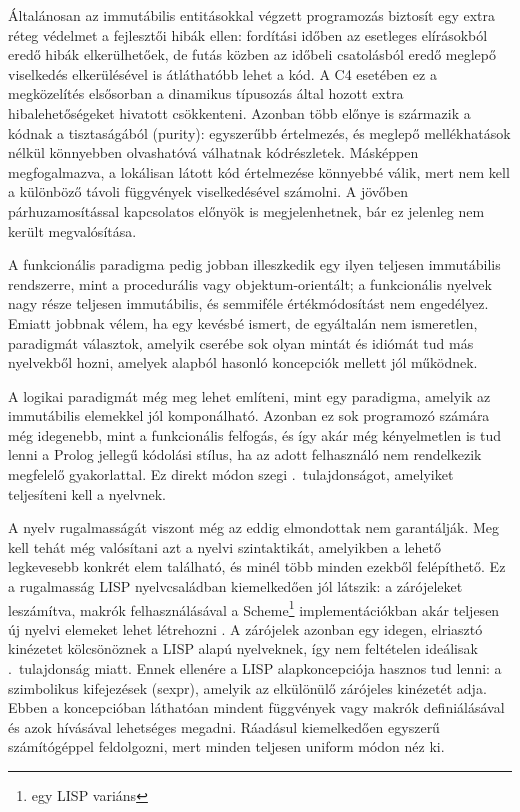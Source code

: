 Általánosan az immutábilis entitásokkal végzett programozás biztosít egy extra réteg védelmet a fejlesztői hibák ellen: fordítási időben az esetleges elírásokból eredő hibák elkerülhetőek, de futás közben az időbeli csatolásból eredő meglepő viselkedés elkerülésével is átláthatóbb lehet a kód.
A C4 esetében ez a megközelítés elsősorban a dinamikus típusozás által hozott extra hibalehetőségeket hivatott csökkenteni. 
Azonban több előnye is származik a kódnak a tisztaságából (purity): egyszerűbb értelmezés, és meglepő mellékhatások nélkül könnyebben olvashatóvá válhatnak kódrészletek.
Másképpen megfogalmazva, a lokálisan látott kód értelmezése könnyebbé válik, mert nem kell a különböző távoli függvények viselkedésével számolni.
A jövőben párhuzamosítással kapcsolatos előnyök is megjelenhetnek, bár ez jelenleg nem került megvalósítása.

A funkcionális paradigma pedig jobban illeszkedik egy ilyen teljesen immutábilis rendszerre, mint a procedurális vagy objektum-orientált; a funkcionális nyelvek nagy része teljesen immutábilis, és semmiféle értékmódosítást nem engedélyez.
Emiatt jobbnak vélem, ha egy kevésbé ismert, de egyáltalán nem ismeretlen, paradigmát választok, amelyik cserébe sok olyan mintát és idiómát tud más nyelvekből hozni, amelyek alapból hasonló koncepciók mellett jól működnek.

A logikai paradigmát még meg lehet említeni, mint egy paradigma, amelyik az immutábilis elemekkel jól komponálható.
Azonban ez sok programozó számára még idegenebb, mint a funkcionális felfogás, és így akár még kényelmetlen is tud lenni a Prolog jellegű kódolási stílus, ha az adott felhasználó nem rendelkezik megfelelő gyakorlattal.
Ez direkt módon szegi .~tulajdonságot, amelyiket teljesíteni kell a nyelvnek.

A nyelv rugalmasságát viszont még az eddig elmondottak nem garantálják.
Meg kell tehát még valósítani azt a nyelvi szintaktikát, amelyikben a lehető legkevesebb konkrét elem található, és minél több minden ezekből felépíthető.
Ez a rugalmasság LISP nyelvcsaládban \cite{mccarthyRecursiveFunctionsSymbolic1960} kiemelkedően jól látszik: a zárójeleket leszámítva, makrók felhasználásával a Scheme\footnote{egy LISP variáns} implementációkban akár teljesen új nyelvi elemeket lehet létrehozni \cite{freesoftwarefoundationinc.SyntaxRulesGuile2025}.
A zárójelek azonban egy idegen, elriasztó kinézetet kölcsönöznek a LISP alapú nyelveknek, így nem feltételen ideálisak .~tulajdonság miatt.
Ennek ellenére a LISP alapkoncepciója hasznos tud lenni: a szimbolikus kifejezések (\gls{sexpr}), amelyik az elkülönülő zárójeles kinézetét adja.
Ebben a koncepcióban láthatóan mindent függvények vagy makrók definiálásával és azok hívásával lehetséges megadni.
Ráadásul kiemelkedően egyszerű számítógéppel feldolgozni, mert minden teljesen uniform módon néz ki.


